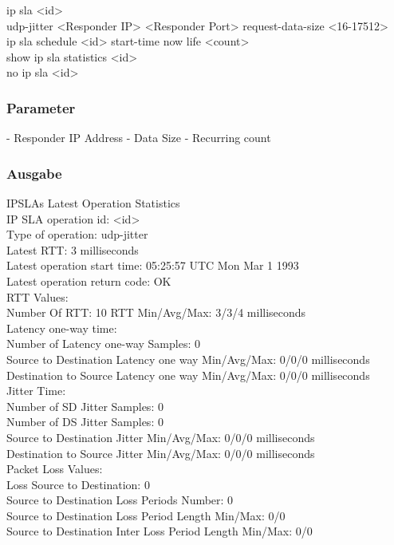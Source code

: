 \documentclass[a4,12pt]{scrartcl}
\begin{document}
\hfill

\noindent ip sla <id>\\
udp-jitter <Responder IP> <Responder Port>
request-data-size <16-17512>\\
ip sla schedule <id> start-time now life <count>\\
show ip sla statistics <id>\\
no ip sla <id>
\subsubsection{Parameter}
- Responder IP Address\newline
- Data Size\newline
- Recurring count\newline
\subsubsection{Ausgabe}
IPSLAs Latest Operation Statistics\\

\noindent IP SLA operation id: <id>\\
Type of operation: udp-jitter\\
        Latest RTT: 3 milliseconds\\
Latest operation start time: 05:25:57 UTC Mon Mar 1 1993\\
Latest operation return code: OK\\
RTT Values:\\
        Number Of RTT: 10               RTT Min/Avg/Max: 3/3/4 milliseconds\\
Latency one-way time:\\
        Number of Latency one-way Samples: 0\\
        Source to Destination Latency one way Min/Avg/Max: 0/0/0 milliseconds\\
        Destination to Source Latency one way Min/Avg/Max: 0/0/0 milliseconds\\
Jitter Time:\\
        Number of SD Jitter Samples: 0\\
        Number of DS Jitter Samples: 0\\
        Source to Destination Jitter Min/Avg/Max: 0/0/0 milliseconds\\
        Destination to Source Jitter Min/Avg/Max: 0/0/0 milliseconds\\
Packet Loss Values:\\
        Loss Source to Destination: 0\\
        Source to Destination Loss Periods Number: 0\\
        Source to Destination Loss Period Length Min/Max: 0/0\\
        Source to Destination Inter Loss Period Length Min/Max: 0/0\\
\end{document}
